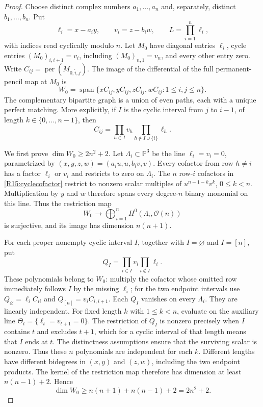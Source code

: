 \begin{proof}
Choose distinct complex numbers $a_1,\ldots,a_n$ and, separately,
distinct $b_1,\ldots,b_n$. Put
\[
 \ell_i=x-a_i y,\qquad v_i=z-b_i w,
 \qquad L=\prod_{i=1}^n\ell_i,
\]
with indices read cyclically modulo $n$.
Let $M_0$ have diagonal entries $\ell_i$, cycle entries
$(M_0)_{i,i+1}=v_i$, including $(M_0)_{n,1}=v_n$, and every
other entry zero. Write
$C_{ij}=\operatorname{per}(M_{0,\widehat i,\widehat j})$.
The image of the differential of the full permanent-pencil map
at $M_0$ is
\[
 W_0=\operatorname{span}\{xC_{ij},yC_{ij},zC_{ij},wC_{ij}:1\leq i,j\leq n\}.
\]
The complementary bipartite graph is a union of even paths,
each with a unique perfect matching. More explicitly, if $I$
is the cyclic interval from $j$ to $i-1$, of length
$k\in\{0,\ldots,n-1\}$, then
\begin{equation}\label{R15:cyclecofactor}
 C_{ij}=\prod_{h\in I}v_h
        \prod_{h\notin I\cup\{i\}}\ell_h.
\end{equation}

We first prove $\dim W_0\geq2n^2+2$.
Let $\Lambda_i\subset\mathbb P^3$ be the line
$\ell_i=v_i=0$, parametrized by
$(x,y,z,w)=(a_i u,u,b_i v,v)$.
Every cofactor from row $h\ne i$ has a factor $\ell_i$ or $v_i$
and restricts to zero on $\Lambda_i$.
The $n$ row-$i$ cofactors in \eqref{R15:cyclecofactor} restrict
to nonzero scalar multiples of
$u^{n-1-k}v^k$, $0\leq k<n$.
Multiplication by $y$ and $w$ therefore spans every degree-$n$
binary monomial on this line. Thus the restriction map
\[
 W_0\longrightarrow\bigoplus_{i=1}^n H^0(\Lambda_i,\mathcal O(n))
\]
is surjective, and its image has dimension $n(n+1)$.

For each proper nonempty cyclic interval $I$, together with
$I=\varnothing$ and $I=[n]$, put
\[
 Q_I=\prod_{i\in I}v_i\prod_{i\notin I}\ell_i.
\]
These polynomials belong to $W_0$: multiply the cofactor whose
omitted row immediately follows $I$ by the missing $\ell_i$;
for the two endpoint intervals use
$Q_\varnothing=\ell_iC_{ii}$ and
$Q_{[n]}=v_iC_{i,i+1}$.
Each $Q_I$ vanishes on every $\Lambda_i$.
They are linearly independent. For fixed length $k$ with
$1\leq k<n$, evaluate on the auxiliary line
$\Theta_t=\{\ell_t=v_{t+1}=0\}$.
The restriction of $Q_I$ is nonzero precisely when $I$ contains
$t$ and excludes $t+1$, which for a cyclic interval of that
length means that $I$ ends at $t$. The distinctness assumptions
ensure that the surviving scalar is nonzero. Thus these $n$
polynomials are independent for each $k$. Different lengths have
different bidegrees in $(x,y)$ and $(z,w)$, including the two
endpoint products. The kernel of the restriction map therefore
has dimension at least $n(n-1)+2$. Hence
\begin{equation}\label{R15:baserank}
 \dim W_0\geq n(n+1)+n(n-1)+2=2n^2+2.
\end{equation}


\end{proof}
